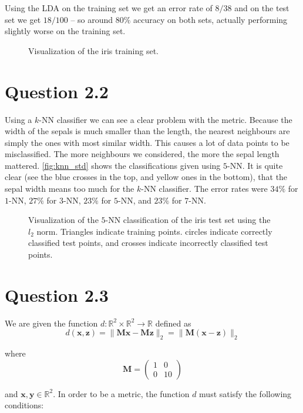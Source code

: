 \documentclass[11pt,a4paper]{article}
\begin{document}
Using the LDA on the training set we get an error rate of $8/38$ and on the
test set we get $18/100$ -- so around $80\%$ accuracy on both sets, actually
performing slightly worse on the training set.

\begin{figure}[htbp]
    \centering
    \caption{Visualization of the iris training set.}
    \label{fig:iris_train}
\end{figure}


\section{Question 2.2}

Using a $k$-NN classifier we can see a clear problem with the metric. Because
the width of the sepals is much smaller than the length, the nearest neighbours
are simply the ones with most similar width. This causes a lot of data points
to be misclassified. The more neighbours we considered, the more the sepal
length mattered. \autoref{fig:knn_std} shows the classifications given using
$5$-NN. It is quite clear (see the blue crosses in the top, and yellow ones in
the bottom), that the sepal width means too much for the $k$-NN classifier.
The error rates were $34\%$ for $1$-NN, $27\%$ for $3$-NN, $23\%$ for $5$-NN,
and $23\%$ for $7$-NN.

\begin{figure}[htbp]
    \centering
    \caption{Visualization of the $5$-NN classification of the iris test set
    using the $l_2$ norm. Triangles indicate training points. circles indicate
    correctly classified test points, and crosses indicate incorrectly classified
    test points.}
    \label{fig:knn_std}
\end{figure}


\section{Question 2.3}
We are given the function $d : \mathbb{R}^2 \times \mathbb{R}^2 \rightarrow \mathbb{R}$ defined as
$$d(\bm{x},\bm{z}) = \| \bm{Mx} - \bm{Mz} \|_{2} = \| \bm{M}(\bm{x} - \bm{z}) \|_{2}$$

where
$$\bm{M} = \begin{pmatrix} 1 & 0 \\ 0 & 10 \end{pmatrix}$$

and $\bm{x},\bm{y} \in \mathbb{R}^2$. In order to be a metric, the function $d$ must satisfy the following conditions:
\end{document}
